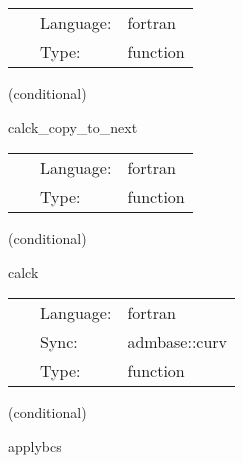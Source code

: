\hspace{5mm}{\it copy admbase::metric to calck::metric\_prev2 } 


\hspace{5mm}

 \begin{tabular*}{160mm}{cll} 
~ & Language:  & fortran \\ 
~ & Type:  & function \\ 
\end{tabular*} 


\vspace{5mm}

   (conditional) 

\hspace{5mm} calck\_copy\_to\_next 

\hspace{5mm}{\it copy admbase::metric to calck::metric\_next } 


\hspace{5mm}

 \begin{tabular*}{160mm}{cll} 
~ & Language:  & fortran \\ 
~ & Type:  & function \\ 
\end{tabular*} 


\vspace{5mm}

   (conditional) 

\hspace{5mm} calck 

\hspace{5mm}{\it calculate k\_ij from gamma\_ij, alpha, and beta\^i } 


\hspace{5mm}

 \begin{tabular*}{160mm}{cll} 
~ & Language:  & fortran \\ 
~ & Sync:  & admbase::curv \\ 
~ & Type:  & function \\ 
\end{tabular*} 


\vspace{5mm}

   (conditional) 

\hspace{5mm} applybcs 

\hspace{5mm}{\it apply boundary conditions } 


